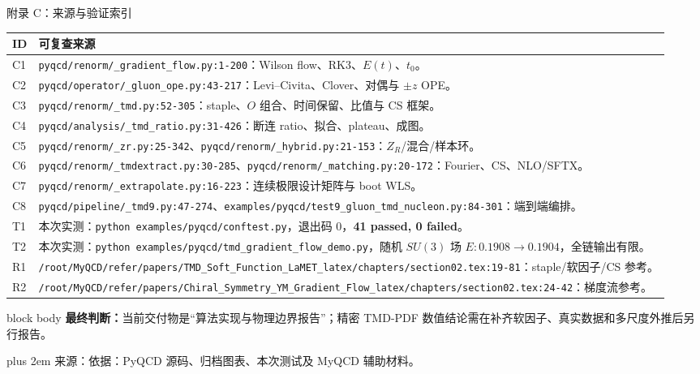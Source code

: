 \documentclass[UTF8,aspectratio=169,11pt]{ctexbeamer}
\renewcommand{\arraystretch}{0.92}
\newcommand{\source}[1]{%
  \par\vspace{0.02em}\begingroup\fontsize{6}{6.8}\selectfont\raggedright\sloppy
  \setlength{\emergencystretch}{3em}\rightskip=0pt plus 2em
  \color{muted}来源：#1\par\endgroup}
\begin{document}
\begin{frame}[t]{附录 C：来源与验证索引}
  \scriptsize
  \renewcommand{\arraystretch}{0.78}
  \begin{tabularx}{0.98\textwidth}{@{}p{}Y@{}}
    \toprule
    ID & 可复查来源\\
    \midrule
    C1 & \nolinkurl{pyqcd/renorm/_gradient_flow.py:1-200}：Wilson flow、RK3、\(E(t)\)、\(t_0\)。\\
    C2 & \nolinkurl{pyqcd/operator/_gluon_ope.py:43-217}：Levi--Civita、Clover、对偶与 \(\pm z\) OPE。\\
    C3 & \nolinkurl{pyqcd/renorm/_tmd.py:52-305}：staple、\(O\) 组合、时间保留、比值与 CS 框架。\\
    C4 & \nolinkurl{pyqcd/analysis/_tmd_ratio.py:31-426}：断连 ratio、拟合、plateau、成图。\\
    C5 & \nolinkurl{pyqcd/renorm/_zr.py:25-342}、\nolinkurl{pyqcd/renorm/_hybrid.py:21-153}：\(Z_R\)/混合/样本环。\\
    C6 & \nolinkurl{pyqcd/renorm/_tmdextract.py:30-285}、\nolinkurl{pyqcd/renorm/_matching.py:20-172}：Fourier、CS、NLO/SFTX。\\
    C7 & \nolinkurl{pyqcd/renorm/_extrapolate.py:16-223}：连续极限设计矩阵与 boot WLS。\\
    C8 & \nolinkurl{pyqcd/pipeline/_tmd9.py:47-274}、\nolinkurl{examples/pyqcd/test9_gluon_tmd_nucleon.py:84-301}：端到端编排。\\
    T1 & 本次实测：\texttt{python examples/pyqcd/conftest.py}，退出码 0，\textbf{41 passed, 0 failed}。\\
    T2 & 本次实测：\texttt{python examples/pyqcd/tmd\_gradient\_flow\_demo.py}，随机 \(SU(3)\) 场 \(E:0.1908\to0.1904\)，全链输出有限。\\
    R1 & \nolinkurl{/root/MyQCD/refer/papers/TMD_Soft_Function_LaMET_latex/chapters/section02.tex:19-81}：staple/软因子/CS 参考。\\
    R2 & \nolinkurl{/root/MyQCD/refer/papers/Chiral_Symmetry_YM_Gradient_Flow_latex/chapters/section02.tex:24-42}：梯度流参考。\\
    \bottomrule
  \end{tabularx}
  \vspace{0.1em}
  \begin{beamercolorbox}[wd=0.98\textwidth,sep=0.35em,rounded=true]{block body}
    \textbf{最终判断：}当前交付物是“算法实现与物理边界报告”；精密 TMD-PDF 数值结论需在补齐软因子、真实数据和多尺度外推后另行报告。
  \end{beamercolorbox}
  \source{依据：PyQCD 源码、归档图表、本次测试及 MyQCD 辅助材料。}
\end{frame}
\end{document}
